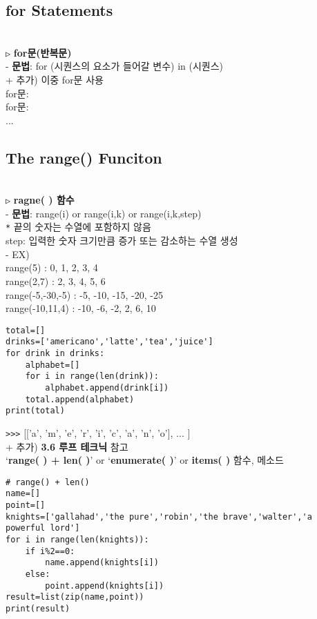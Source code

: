 \documentclass[11pt,a4paper]{article}
\begin{document}
\begin{spacing}{1.5}
\subsection{\Large\textbf{for Statements}}\\
\texttt{▷} \textbf{for문(반복문)}\\
- \textbf{문법}: for   (시퀀스의 요소가 들어갈 변수)   in   (시퀀스)\\
+ 추가) 이중 for문 사용\\
for문:\\
\hspace*{2em}for문:\\
\hspace*{4em}...

\subsection{\Large\textbf{The range() Funciton}}\\
\texttt{▷} \textbf{ragne( ) 함수}\\
- \textbf{문법}: range(i) or range(i,k) or range(i,k,step)\\
\hspace*{2em}\texttt{*} 끝의 숫자는 수열에 포함하지 않음\\
\hspace*{3em}step: 입력한 숫자 크기만큼 증가 또는 감소하는 수열 생성\\

- EX)\\
\hspace*{2em}range(5) : 0, 1, 2, 3, 4\\
\hspace*{2em}range(2,7) : 2, 3, 4, 5, 6\\
\hspace*{2em}range(-5,-30,-5) : -5, -10, -15, -20, -25\\
\hspace*{2em}range(-10,11,4) : -10, -6, -2, 2, 6, 10

\begin{lstlisting}[label={list:first},caption=for Statements and range( )]
total=[]
drinks=['americano','latte','tea','juice']
for drink in drinks:
    alphabet=[]
    for i in range(len(drink)):
        alphabet.append(drink[i])
    total.append(alphabet)
print(total)
\end{lstlisting}
\verb|>>>| [['a', 'm', 'e', 'r', 'i', 'c', 'a', 'n', 'o'], ... ]\\

+ 추가)    \textbf{3.6 루프 테크닉} 참고\\
`\textbf{range( ) + len( )}'   or   `\textbf{enumerate( )}'   or   \textbf{items( )} 함수, 메소드\\
\begin{lstlisting}[label={list:first}]
# range() + len()
name=[]
point=[]
knights=['gallahad','the pure','robin','the brave','walter','a powerful lord']
for i in range(len(knights)):
    if i%2==0:
        name.append(knights[i])
    else:
        point.append(knights[i])
result=list(zip(name,point))
print(result)



\end{lstlisting}
\end{spacing}
\end{document}
